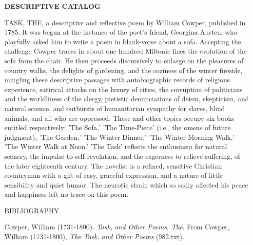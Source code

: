 \documentclass{book}
\begin{document}
{\newpage
\null

\newpage
\null

\newpage
{}
\pagestyle{fancy}
\fancyhf{}
\newpage
\begin{center}
\textbf{DESCRIPTIVE CATALOG}
\end{center}
\fancyfoot[LE,RO]{\thepage}

\par
TASK, THE, a descriptive and reflective poem by William Cowper, published in 1785. It was begun at the instance of the poet's friend, Georgina Austen, who playfully asked him to write a poem in blank-verse about a sofa. Accepting the challenge Cowper traces in about one hundred Miltonic lines the evolution of the sofa from the chair. He then proceeds discursively to enlarge on the pleasures of country walks, the delights of gardening, and the coziness of the winter fireside, mingling these descriptive passages with autobiographic records of religious experience, satirical attacks on the luxury of cities, the corruption of politicians and the worldliness of the clergy, pietistic denunciations of deism, skepticism, and natural science, and outbursts of humanitarian sympathy for slaves, blind animals, and all who are oppressed. These and other topics occupy six books entitled respectively: 'The Sofa,' 'The Time-Piece' (i.e., the omens of future judgment), 'The Garden,' 'The Winter Dinner,' 'The Winter Morning Walk,' 'The Winter Walk at Noon.' 'The Task' reflects the enthusiasm for natural scenery, the impulse to self-revelation, and the eagerness to relieve suffering, of the later eighteenth century. The novelist is a refined, sensitive Christian countryman with a gift of easy, graceful expression, and a nature of little sensibility and quiet humor. The neurotic strain which so sadly affected his peace and happiness left no trace on this poem.
\vspace{0.25in}
\fancyfoot[LE,RO]{\thepage}
\newpage
\begin{center}
BIBLIOGRAPHY
\end{center}
\begin{flushleft}
\parindent=0pt
\hangindent=10mm
\par
Cowper, William (1731-1800).  \textit{Task, and Other Poems, The}.  From Cowper, William (1731-1800), \textit{The Task, and Other Poems} (982.txt).\linebreak
\vspace{-5mm}
\end{flushleft}

}
\end{document}
